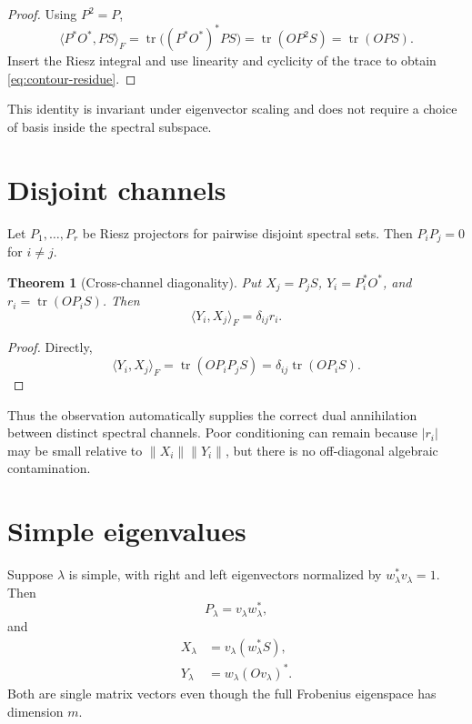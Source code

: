 \documentclass[12pt]{article}
\newtheorem{theorem}{Theorem}[section]
\theoremstyle{remark}
\newcommand{\norm}[1]{\left\lVert#1\right\rVert}
\begin{document}
\begin{proof}
Using $P^2=P$,
\[
 \langle P^*O^*,PS\rangle_F
 =\operatorname{tr}\big((P^*O^*)^*PS\big)
 =\operatorname{tr}(OP^2S)
 =\operatorname{tr}(OPS).
\]
Insert the Riesz integral and use linearity and cyclicity of the trace to
obtain \eqref{eq:contour-residue}.
\end{proof}

This identity is invariant under eigenvector scaling and does not require a
choice of basis inside the spectral subspace.

\section{Disjoint channels}

Let $P_1,\ldots,P_r$ be Riesz projectors for pairwise disjoint spectral
sets.  Then $P_iP_j=0$ for $i\ne j$.

\begin{theorem}[Cross-channel diagonality]\label{thm:cross-diagonal}
Put $X_j=P_jS$, $Y_i=P_i^*O^*$, and
$r_i=\operatorname{tr}(OP_iS)$.  Then
\begin{equation}\label{eq:cross-diagonal}
 \boxed{\langle Y_i,X_j\rangle_F=\delta_{ij}r_i.}
\end{equation}
\end{theorem}

\begin{proof}
Directly,
\[
 \langle Y_i,X_j\rangle_F
 =\operatorname{tr}(OP_iP_jS)
 =\delta_{ij}\operatorname{tr}(OP_iS).
\]
\end{proof}

Thus the observation automatically supplies the correct dual annihilation
between distinct spectral channels.  Poor conditioning can remain because
$|r_i|$ may be small relative to $\norm{X_i}\norm{Y_i}$, but there is no
off-diagonal algebraic contamination.

\section{Simple eigenvalues}

Suppose $\lambda$ is simple, with right and left eigenvectors normalized by
$w_\lambda^*v_\lambda=1$.  Then
\begin{equation}\label{eq:rank-one-projector}
 P_\lambda=v_\lambda w_\lambda^*,
\end{equation}
and
\begin{align}
 X_\lambda&=v_\lambda(w_\lambda^*S),\\
 Y_\lambda&=w_\lambda(Ov_\lambda)^*.
\end{align}
Both are single matrix vectors even though the full Frobenius eigenspace has
dimension $m$.
\end{document}

